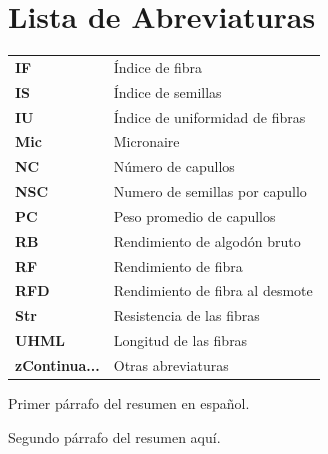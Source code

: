 \documentclass[12pt,oneside]{reedthesis}
\begin{document}
\chapter*{Lista de Abreviaturas}
\begin{table}[h]
    \centering
    \begin{tabular}{ll}
                \textbf{IF} & Índice de fibra \\
                \textbf{IS} & Índice de semillas \\
                \textbf{IU} & Índice de uniformidad de fibras \\
                \textbf{Mic} & Micronaire \\
                \textbf{NC} & Número de capullos \\
                \textbf{NSC} & Numero de semillas por capullo \\
                \textbf{PC} & Peso promedio de capullos \\
                \textbf{RB} & Rendimiento de algodón bruto \\
                \textbf{RF} & Rendimiento de fibra \\
                \textbf{RFD} & Rendimiento de fibra al desmote \\
                \textbf{Str} & Resistencia de las fibras \\
                \textbf{UHML} & Longitud de las fibras \\
                \textbf{zContinua...} & Otras abreviaturas \\
            \end{tabular}
\end{table}
\thispagestyle{fancy} %
    \fancyhf{} %
    \fancyhead{} %
    \fancyfoot[R]{\thepage} %

  \begin{resumen}
    Primer párrafo del resumen en español.

    \par

    Segundo párrafo del resumen aquí.
    \thispagestyle{fancy} %
    \fancyhf{} %
    \fancyhead{} %
    \fancyfoot[R]{\thepage} %
  \end{resumen}
\end{document}
